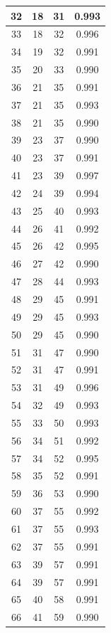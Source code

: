 \begin{table}
\begin{tabular}{|c|c|c|c|}
 32  & 18  & 31 & 0.993  \\ \hline
 33  & 18  & 32 & 0.996  \\ \hline
 34  & 19  & 32 & 0.991  \\ \hline
 35  & 20  & 33 & 0.990  \\ \hline
 36  & 21  & 35 & 0.991  \\ \hline
 37  & 21  & 35 & 0.993  \\ \hline
 38  & 21  & 35 & 0.990  \\ \hline
 39  & 23  & 37 & 0.990  \\ \hline
 40  & 23  & 37 & 0.991  \\ \hline
 41  & 23  & 39 & 0.997  \\ \hline
 42  & 24  & 39 & 0.994  \\ \hline
 43  & 25  & 40 & 0.993  \\ \hline
 44  & 26  & 41 & 0.992  \\ \hline
 45  & 26  & 42 & 0.995  \\ \hline
 46  & 27  & 42 & 0.990  \\ \hline
 47  & 28  & 44 & 0.993  \\ \hline
 48  & 29  & 45 & 0.991  \\ \hline
 49  & 29  & 45 & 0.993  \\ \hline
 50  & 29  & 45 & 0.990  \\ \hline
 51  & 31  & 47 & 0.990  \\ \hline
 52  & 31  & 47 & 0.991  \\ \hline
 53  & 31  & 49 & 0.996  \\ \hline
 54  & 32  & 49 & 0.993  \\ \hline
 55  & 33  & 50 & 0.993  \\ \hline
 56  & 34  & 51 & 0.992  \\ \hline
 57  & 34  & 52 & 0.995  \\ \hline
 58  & 35  & 52 & 0.991  \\ \hline
 59  & 36  & 53 & 0.990  \\ \hline
 60  & 37  & 55 & 0.992  \\ \hline
 61  & 37  & 55 & 0.993  \\ \hline
 62  & 37  & 55 & 0.991  \\ \hline
 63  & 39  & 57 & 0.991  \\ \hline
 64  & 39  & 57 & 0.991  \\ \hline
 65  & 40  & 58 & 0.991  \\ \hline
 66  & 41  & 59 & 0.990  \\ \hline

\end{tabular}
\end{table}
